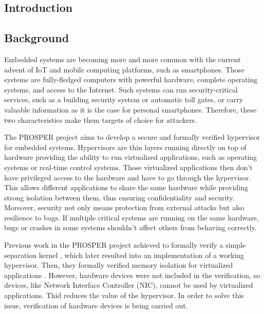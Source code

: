 \documentclass[10pt,a4paper]{article}
\begin{document}
\begin{multicols}{2}


\section{Introduction}

\subsection{Background}

Embedded systems are becoming more and more common with the current advent of {IoT} and mobile computing platforms, such as smartphones. Those systems are fully-fledged computers with powerful hardware, complete operating systems, and access to the Internet. Such systems can run security-critical services, such as a building security system or automatic toll gates, or carry valuable information as it is the case for personal smartphones. Therefore, these two characteristics make them targets of choice for attackers.

The {PROSPER} project \cite{noauthor_prosper:_nodate-1} aims to develop a secure and formally verified hypervisor for embedded systems. Hypervisors are thin layers running directly on top of hardware providing the ability to run virtualized applications, such as operating systems or real-time control systems. Those virtualized applications then don't have privileged access to the hardware and have to go through the hypervisor. This allows different applications to share the same hardware while providing strong isolation between them, thus ensuring confidentiality and security. Moreover, security not only means protection from external attacks but also resilience to bugs. If multiple critical systems are running on the same hardware, bugs or crashes in some systems shouldn't affect others from behaving correctly.

Previous work in the {PROSPER} project achieved to formally verify a simple separation kernel \cite{dam_formal_2013}, which later resulted into an implementation of a working hypervisor. Then, they formally verified memory isolation for virtualized applications \cite{nemati_trustworthy_2015}. However, hardware devices were not included in the verification, so devices, like Network Interface Controller ({NIC}), cannot be used by virtualized applications. Thid reduces the value of the hypervisor. In order to solve this issue, verification of hardware devices is being carried out.


\end{multicols}
\end{document}
